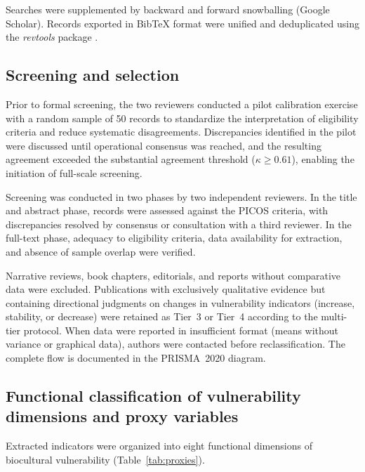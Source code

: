 \documentclass[12pt,a4paper]{article}
\begin{document}
Searches were supplemented by backward and forward snowballing (Google Scholar). Records exported in BibTeX format were unified and deduplicated using the \textit{revtools} package \citep{Westgate2019}.

\subsection{Screening and selection}
\label{sec:screening}

Prior to formal screening, the two reviewers conducted a pilot calibration exercise with a random sample of 50 records to standardize the interpretation of eligibility criteria and reduce systematic disagreements. Discrepancies identified in the pilot were discussed until operational consensus was reached, and the resulting agreement exceeded the substantial agreement threshold ($\kappa \geq 0.61$), enabling the initiation of full-scale screening.

Screening was conducted in two phases by two independent reviewers. In the title and abstract phase, records were assessed against the PICOS criteria, with discrepancies resolved by consensus or consultation with a third reviewer. In the full-text phase, adequacy to eligibility criteria, data availability for extraction, and absence of sample overlap were verified.

Narrative reviews, book chapters, editorials, and reports without comparative data were excluded. Publications with exclusively qualitative evidence but containing directional judgments on changes in vulnerability indicators (increase, stability, or decrease) were retained as Tier~3 or Tier~4 according to the multi-tier protocol. When data were reported in insufficient format (means without variance or graphical data), authors were contacted before reclassification. The complete flow is documented in the PRISMA~2020 diagram.

\subsection{Functional classification of vulnerability dimensions and proxy variables}
\label{sec:dimensions}

Extracted indicators were organized into eight functional dimensions of biocultural vulnerability (Table~\ref{tab:proxies}).
\end{document}
